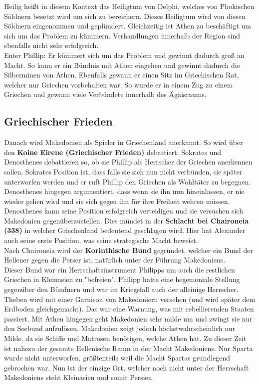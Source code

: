 \documentclass{article}
\begin{document}
	Heilig heißt in diesem Kontext das Heiligtum von Delphi, welches von Phokischen Söldnern besetzt wird um sich zu bereichern. Dieses Heiligtum wird von diesen Söldnern eingenommen und geplündert. Gleichzeitig ist Athen zu beschäftigt um sich um das Problem zu kümmern. Verhandlungen innerhalb der Region sind ebenfalls nicht sehr erfolgreich. \\
	Enter Phillip: Er kümmert sich um das Problem und gewinnt dadurch groß an Macht. So kann er ein Bündnis mit Athen eingehen und gewinnt dadurch die Silberminen von Athen. Ebenfalls gewann er einen Sitz im Griechischen Rat, welcher nur Griechen vorbehalten war. So wurde er in einem Zug zu einem Griechen und gewann viele Verbündete innerhalb des Ägäisraums. \\
	\subsection{Griechischer Frieden}
	Danach wird Makedonien als Spieler in Griechenland anerkannt. So wird über den \textbf{Koine Eirene (Griechischer Frieden)} debattiert. Sokrates und Denosthenes debattieren so, ob sie Phillip als Herrscher der Griechen anerkennen sollen. Sokrates Position ist, dass falls sie sich nun nicht verbünden, sie später unterworfen werden und er ruft Phillip den Griechen als Wohltäter zu begegnen. Denosthenes hingegen argumentiert, dass wenn sie ihn nun hineinlassen, er nie wieder gehen wird und sie sich gegen ihn für ihre Freiheit wehren müssen. \\
	Denosthenes kann seine Position erfolgreich verteidigen und sie versuchen sich Makedonien gegenüberzustellen. Dies mündet in der \textbf{Schlacht bei Chaironeia (338)} in welcher Griechenland bedeutend geschlagen wird. Hier hat Alexander auch seine erste Position, was seine strategische Macht beweist. \\
	Nach Chaironeia wird der \textbf{Korinthische Bund} gegründet, welcher ein Bund der Hellener gegen die Perser ist, natürlich unter der Führung Makedoniens. \\
	Dieser Bund war ein Herrschaftsinstrument Philipps um auch die restlichen Griechen in Kleinasien zu "befreien". Philipp hatte eine hegemoniale Stellung gegenüber den Bündnern und war im Kriegsfall auch der alleinige Herrscher. \\
	Theben wird mit einer Garnison von Makedoniern versehen (und wird später dem Erdboden gleichgemacht). Das war eine Warnung, was mit rebellierenden Staaten passiert. Mit Athen hingegen geht Makedonien sehr milde um und zwingt sie nur den Seebund aufzulösen. Makedonien zeigt jedoch höchstwahrscheinlich nur Milde, da sie Schiffe und Matrosen benötigen, welche Athen hat. Zu dieser Zeit ist nahezu der gesamte Hellenische Raum in der Macht Makedoniens. Nur Sparta wurde nicht unterworfen, größtenteils weil die Macht Spartas grundlegend gebrochen war. Nun ist der einzige Ort, welcher noch nicht unter der Herrschaft Makedoniens steht Kleinasien und somit Persien. \\
\end{document}
